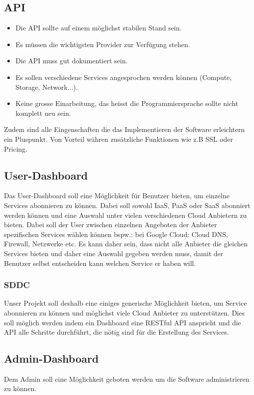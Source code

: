 

\subsection{API}
\begin{itemize}
\item Die API sollte auf einem möglichst stabilen Stand sein.
\item Es müssen die wichtigsten Provider zur Verfügung stehen.
\item Die API muss gut dokumentiert sein.
\item Es sollen verschiedene Services angesprochen werden können (Compute, Storage, Network...).
\item Keine grosse Einarbeitung, das heisst die Programmiersprache sollte nicht komplett neu sein.
\end{itemize}
Zudem sind alle Eingenschaften die das Implementieren der Software erleichtern ein 
Pluspunkt. Von Vorteil währen zusätzliche Funktionen wie z.B SSL oder Pricing. 

\subsection{User-Dashboard}
Das User-Dashboard soll eine Möglichkeit für Benutzer bieten, um einzelne Services 
abonnieren zu können.
Dabei soll sowohl \ac{IaaS}, \ac{PaaS} oder \ac{SaaS} abonniert werden können und eine Auswahl 
 unter vielen verschiedenen Cloud Anbietern zu bieten.
Dabei soll der User zwischen einzelnen Angeboten der Anbieter spezifischen 
Services wählen können bspw.: bei Google Cloud: Cloud DNS, Firewall, Netzwerke etc.
Es kann daher sein, dass nicht alle Anbieter die gleichen Services bieten und 
daher eine Auswahl gegeben werden muss, damit der Benutzer selbst entscheiden 
kann welchen Service er haben will.

\subsubsection{SDDC}
Unser Projekt soll deshalb eine einiges generische Möglichkeit bieten, um 
Service abonnieren zu können und möglichst viele Cloud Anbieter zu 
unterstützen.
Dies soll möglich werden indem ein Dashboard eine RESTful API anspricht und 
die API alle Schritte durchführt, die nötig sind für die Erstellung des 
Services.

\subsection{Admin-Dashboard}
Dem Admin soll eine Möglichkeit geboten werden um die Software administrieren zu 
können.
